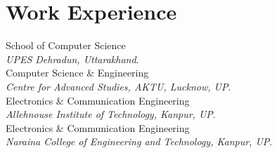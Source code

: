 \vspace{-2.5em}\section{Work Experience}
 School of Computer Science  \\
{\sl UPES Dehradun, Uttarakhand}.\\
 Computer Science \& Engineering  \\
{\sl Centre for Advanced Studies, AKTU, Lucknow, UP}.\\
 Electronics \& Communication Engineering \\
{\sl Allehnouse Institute of Technology, Kanpur, UP}.\\
 Electronics \& Communication Engineering  \\
{\sl Naraina College of Engineering and Technology, Kanpur, UP}.\\
\vspace{-1em}
\sectionline
